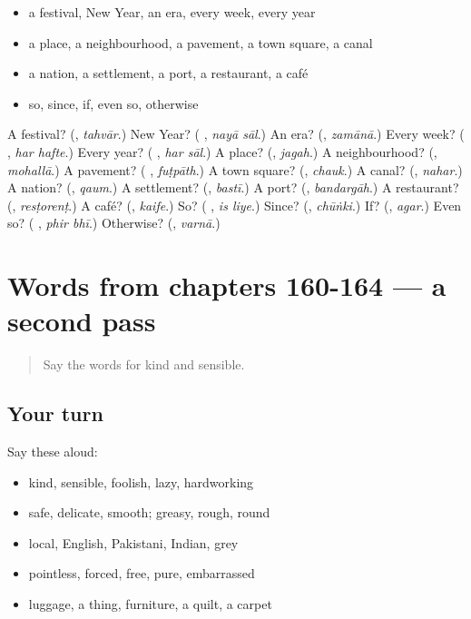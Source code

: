 \begin{itemize}
\raggedright
  \item a festival, New Year, an era, every week, every year
  \item a place, a neighbourhood, a pavement, a town square, a canal
  \item a nation, a settlement, a port, a restaurant, a café
  \item so, since, if, even so, otherwise
\end{itemize}

\begin{tcolorbox}[breakable,colback=teal!4,colframe=teal!35!black,title={Before you move on}]
A festival? (\textbf{}, \emph{tahvār}.) New Year? (\textbf{ }, \emph{nayā sāl}.) An era? (\textbf{}, \emph{zamānā}.) Every week? (\textbf{ }, \emph{har hafte}.) Every year? (\textbf{ }, \emph{har sāl}.) A place? (\textbf{}, \emph{jagah}.) A neighbourhood? (\textbf{}, \emph{mohallā}.) A pavement? (\textbf{ }, \emph{fuṭpāth}.) A town square? (\textbf{}, \emph{chauk}.) A canal? (\textbf{}, \emph{nahar}.) A nation? (\textbf{}, \emph{qaum}.) A settlement? (\textbf{}, \emph{bastī}.) A port? (\textbf{}, \emph{bandargāh}.) A restaurant? (\textbf{}, \emph{resṭorenṭ}.) A café? (\textbf{}, \emph{kaife}.) So? (\textbf{ }, \emph{is liye}.) Since? (\textbf{}, \emph{chūṅki}.) If? (\textbf{}, \emph{agar}.) Even so? (\textbf{ }, \emph{phir bhī}.) Otherwise? (\textbf{}, \emph{varnā}.)
\end{tcolorbox}
\section[(dialogue)]{Words from chapters 160-164 — a second pass}

\label{lesson:UR-R164-second-pass-words-from-chapters-160-164}



\begin{quote}
Say the words for kind and sensible.
\end{quote}

\subsection*{Your turn}
Say these aloud:

\begin{itemize}
\raggedright
  \item kind, sensible, foolish, lazy, hardworking
  \item safe, delicate, smooth; greasy, rough, round
  \item local, English, Pakistani, Indian, grey
  \item pointless, forced, free, pure, embarrassed
  \item luggage, a thing, furniture, a quilt, a carpet
\end{itemize}

